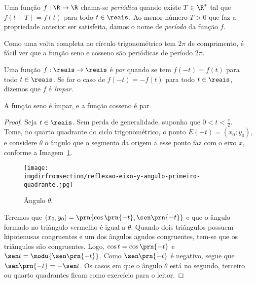 \begin{definition}
\label{def:funcao-periodica}
    Uma função $f: \R \to \R$ chama-se \emph{periódica} quando existe $T
\in \R^\ast$ tal que $f(t + T) = f(t)$ para todo $t \in \reais$. Ao
menor número $T>0$ que faz a propriedade anterior ser satisfeita,
damos o nome de \emph{período} da função $f$.
\end{definition}

\begin{remark}
    Como uma volta completa no círculo trigonométrico tem $2 \pi$ de
comprimento, é fácil ver que a função seno e cosseno são periódicas
de período $2\pi$.
\end{remark}

\begin{definition}
\label{def:funcao-par-impar}
    Uma função $f: \reais \to \reais$ é \emph{par} quando se tem $f(-t) = f(t)$
para todo $t\in \reais$. Se for o caso de $f(-t) = - f(t)$ para todo $t
\in \reais$, dizemos que $f$ é \emph{ímpar}.
\end{definition}

 \begin{proposition}
     A função seno é ímpar, e a função cosseno é par.
 \end{proposition}

\begin{proof}
    Seja $t \in \reais$. Sem perda de generalidade, suponha que $0 < t < \frac \pi 2$.
    Tome, no quarto quadrante do ciclo trigonométrico, o ponto $E(-t) = (x_0; y_0)$, e considere 
    $\theta$ o ângulo que o segmento da origem a esse ponto faz com o eixo $x$, conforme a Imagem~\ref{img:reflexao-eixo-y-angulo-primeiro-quadrante}.
    \begin{figure}[H]
        \centering
        \texttt{[image: \\imgdirfromsection/reflexao-eixo-y-angulo-primeiro-quadrante.jpg]}
        \caption{Ângulo $\theta$.}
        \label{img:reflexao-eixo-y-angulo-primeiro-quadrante}
    \end{figure}
    Teremos que $(x_0, y_0) =\prn{\cos\prn{-t}, \sen\prn{-t}}$ e que o ângulo formado no triângulo vermelho é igual a $\theta$.
    Quando dois triângulos possuem hipotenusas congruentes e um dos ângulos agudos congruentes, tem-se que os triângulos são congruentes.
    Logo, $\cos t = \cos\prn{-t}$ e $\sen t = \modu{\sen\prn{- t}}$. Como $\sen\prn{-t}$ é negativo, segue que 
    $\sen\prn{-t} = -\sen t$. Os casos em que o ângulo $\theta$ está no segundo, terceiro ou quarto quadrantes ficam como exercício 
    para o leitor.
\end{proof}

